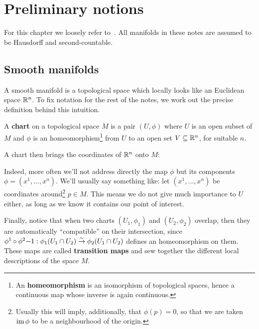 \documentclass[main.tex]{subfiles}
\begin{document}
\chapter{Preliminary notions}
For this chapter we loosely refer to~\cite{abate2011geometria}. All manifolds in these notes are assumed to be Hausdorff and second-countable.

\section{Smooth manifolds}
A smooth manifold is a topological space which locally looks like an Euclidean space $\mathbb{R}^n$. To fix notation for the rest of the notes, we work out the precise definition behind this intuition.

\begin{definition}
	A \textbf{chart} on a topological space $M$ is a pair $(U, \phi)$ where $U$ is an open subset of $M$ and $\phi$ is an homeomorphism\footnote{An \textbf{homeomorphism} is an isomorphism of topological spaces, hence a continuous map whose inverse is again continuous.} from $U$ to an open set $V \subseteq \mathbb{R}^n$, for suitable $n$.
\end{definition}

A chart then brings the coordinates of $\mathbb{R}^n$ onto $M$:

\begin{figure}[H]
	\centering
\end{figure}

Indeed, more often we'll not address directly the map $\phi$ but its components $\phi = (x^1, \ldots, x^n)$. We'll usually say something like: let $(x^1, \ldots, x^n)$ be coordinates around\footnote{Usually this will imply, additionally, that $\phi(p) = 0$, so that we are taken $\operatorname{im} \phi$ to be a neighbourhood of the origin.} $p \in M$. This means we do not give much importance to $U$ either, as long as we know it contains our point of interest.

Finally, notice that when two charts $(U_1, \phi_1)$ and $(U_2, \phi_2)$ overlap, then they are automatically ``compatible'' on their intersection, since $\phi^1 \circ \phi^2{-1} : \phi_1(U_1 \cap U_2) \overset{\sim}\to \phi_2(U_1 \cap U_2)$ defines an homeomorphism on them. These maps are called \textbf{transition maps} and sew together the different local descriptions of the space $M$.
\end{document}
